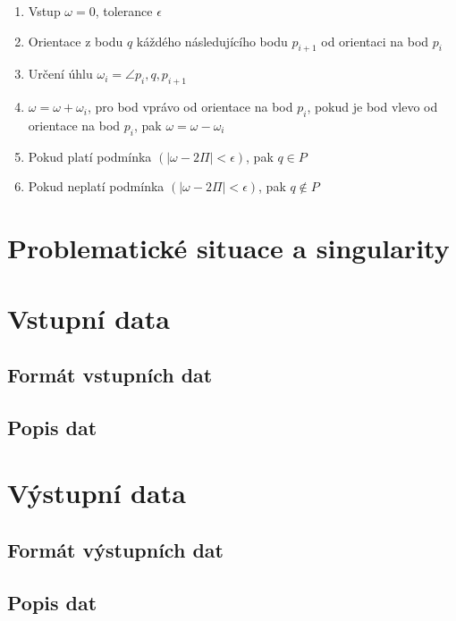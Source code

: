 \documentclass{article}
\begin{document}
\begin{enumerate} 

\item Vstup $\omega = 0$, tolerance $\epsilon$

\item Orientace z bodu $q$ káždého následujícího bodu  $p_{i+1}$ od orientaci na bod $p_i$

\item Určení úhlu $\omega_i = \angle p_i, q, p_{i+1}$ 

\item  $\omega = \omega + \omega_i$, pro bod vprávo od orientace na bod $p_i$, pokud je bod vlevo od orientace na bod $p_i$, pak $\omega = \omega - \omega_i$

\item Pokud platí podmínka $(\left|\omega - 2\Pi \right| < \epsilon)$, pak $q \in P$

\item Pokud neplatí podmínka  $(\left|\omega - 2\Pi \right| < \epsilon)$, pak $q \notin P$

\end{enumerate} 
\clearpage
\newpage
\section{Problematické situace a singularity} %
\clearpage
\section{Vstupní data}
\clearpage
\subsection{Formát vstupních dat}
\clearpage
\subsection{Popis dat}
\clearpage
\section{Výstupní data}
	\subsection{Formát výstupních dat}
	\subsection{Popis dat}
\clearpage
\end{document}
